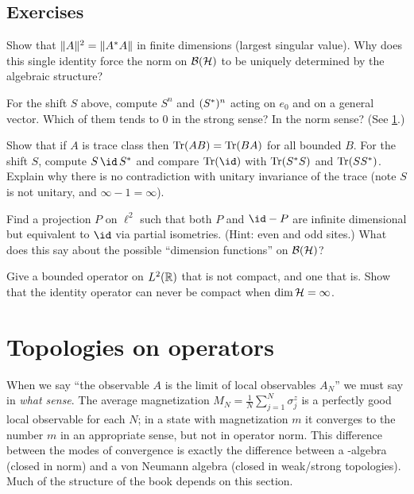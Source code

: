 \subsection*{Exercises}
\begin{exercise}\label{ex:hilbert:1}
Show that $\lVert A\rVert^2=\lVert A^{*} A\rVert$ in finite dimensions (largest singular value). Why does this single identity force the norm on $\mathcal{B}(\mathcal{H})$ to be uniquely determined by the algebraic structure?
\end{exercise}
\begin{exercise}\label{ex:hilbert:2}
For the shift $S$ above, compute $S^n$ and $(S^{*})^n$ acting on $e_0$ and on a general vector. Which of them tends to $0$ in the strong sense? In the norm sense? (See \cref{ch:topologies}.)
\end{exercise}
\begin{exercise}\label{ex:hilbert:3}
Show that if $A$ is trace class then $\operatorname{Tr}(AB)=\operatorname{Tr}(BA)$ for all bounded $B$. For the shift $S$, compute $S\,\id\,S\ad$ and compare $\Tr(\id)$ with $\operatorname{Tr}(S^{*} S)$ and $\operatorname{Tr}(SS^{*})$. Explain why there is no contradiction with unitary invariance of the trace (note $S$ is not unitary, and $\infty-1=\infty$).
\end{exercise}
\begin{exercise}\label{ex:hilbert:4}
Find a projection $P$ on $\ell^2$ such that both $P$ and $\id-P$ are infinite dimensional but equivalent to $\id$ via partial isometries. (Hint: even and odd sites.) What does this say about the possible ``dimension functions'' on $\mathcal{B}(\mathcal{H})$?
\end{exercise}
\begin{exercise}\label{ex:hilbert:5}
Give a bounded operator on $L^2(\mathbb{R})$ that is not compact, and one that is. Show that the identity operator can never be compact when $\dim\mathcal{H}=\infty$.
\end{exercise}

\section{Topologies on operators}\label{ch:topologies}

\begin{physmotiv}
When we say ``the observable $A$ is the limit of local observables $A_N$'' we must say in \emph{what sense}. The average magnetization $M_N=\frac1N\sum_{j=1}^N\sigma^z_j$ is a perfectly good local observable for each $N$; in a state with magnetization $m$ it converges to the number $m$ in an appropriate sense, but not in operator norm. This difference between the modes of convergence is exactly the difference between a \cstar-algebra (closed in norm) and a von Neumann algebra (closed in weak/strong topologies). Much of the structure of the book depends on this section.
\end{physmotiv}

